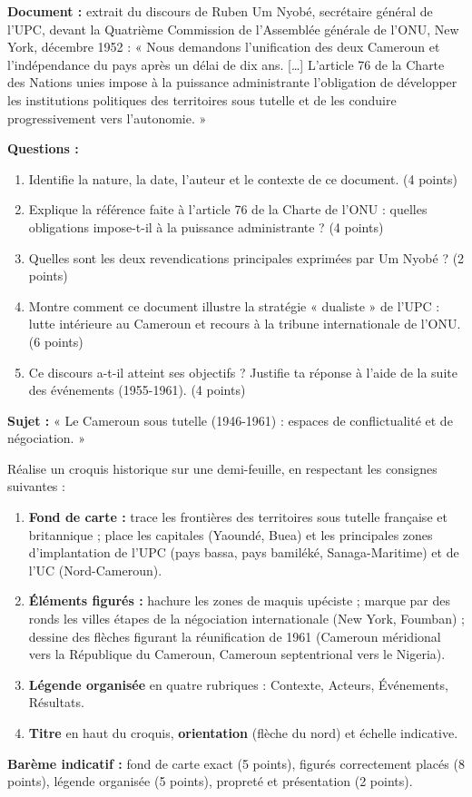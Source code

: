 \documentclass[11pt]{article}
\begin{document}
\begin{exercice}
\textbf{Document :} extrait du discours de Ruben Um Nyobé, secrétaire général de l'UPC, devant la Quatrième Commission de l'Assemblée générale de l'ONU, New York, décembre 1952 : « Nous demandons l'unification des deux Cameroun et l'indépendance du pays après un délai de dix ans. [\ldots] L'article 76 de la Charte des Nations unies impose à la puissance administrante l'obligation de développer les institutions politiques des territoires sous tutelle et de les conduire progressivement vers l'autonomie. »

\textbf{Questions :}
\begin{enumerate}
\item Identifie la nature, la date, l'auteur et le contexte de ce document. (4 points)
\item Explique la référence faite à l'article 76 de la Charte de l'ONU : quelles obligations impose-t-il à la puissance administrante ? (4 points)
\item Quelles sont les deux revendications principales exprimées par Um Nyobé ? (2 points)
\item Montre comment ce document illustre la stratégie « dualiste » de l'UPC : lutte intérieure au Cameroun et recours à la tribune internationale de l'ONU. (6 points)
\item Ce discours a-t-il atteint ses objectifs ? Justifie ta réponse à l'aide de la suite des événements (1955-1961). (4 points)
\end{enumerate}
\end{exercice}

\begin{exercice}
\textbf{Sujet :} « Le Cameroun sous tutelle (1946-1961) : espaces de conflictualité et de négociation. »

Réalise un croquis historique sur une demi-feuille, en respectant les consignes suivantes :
\begin{enumerate}
\item \textbf{Fond de carte :} trace les frontières des territoires sous tutelle française et britannique ; place les capitales (Yaoundé, Buea) et les principales zones d'implantation de l'UPC (pays bassa, pays bamiléké, Sanaga-Maritime) et de l'UC (Nord-Cameroun).
\item \textbf{Éléments figurés :} hachure les zones de maquis upéciste ; marque par des ronds les villes étapes de la négociation internationale (New York, Foumban) ; dessine des flèches figurant la réunification de 1961 (Cameroun méridional vers la République du Cameroun, Cameroun septentrional vers le Nigeria).
\item \textbf{Légende organisée} en quatre rubriques : Contexte, Acteurs, Événements, Résultats.
\item \textbf{Titre} en haut du croquis, \textbf{orientation} (flèche du nord) et échelle indicative.
\end{enumerate}
\textbf{Barème indicatif :} fond de carte exact (5 points), figurés correctement placés (8 points), légende organisée (5 points), propreté et présentation (2 points).
\end{exercice}
\end{document}
